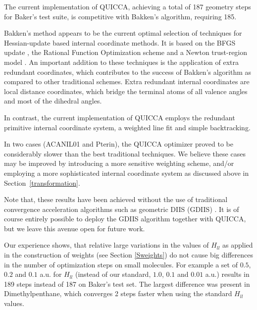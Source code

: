 \documentclass[prl,twocolumn,showpacs,twocolumngrid,superbib]{revtex4}
\begin{document}
The current implementation of QUICCA, achieving a total of 187 geometry steps for Baker's test suite, is 
competitive with Bakken's algorithm, requiring 185.  

Bakken's method \cite{bakken} appears to be the current 
optimal selection of techniques
for Hessian-update based internal coordinate methods. It is based
on the BFGS update \cite{RFletcher}, the Rational Function Optimization
scheme \cite{benerji_RFO} and a Newton trust-region model \cite{RFletcher}. An important addition
to these techniques is the application of
extra redundant coordinates, which contributes to the success of Bakken's
algorithm as compared to other traditional schemes. Extra redundant internal 
coordinates are local distance coordinates, which bridge the terminal atoms
of all valence angles and most of the dihedral angles.

In contrast, the
current implementation of QUICCA employs the redundant primitive internal coordinate system, a weighted line
fit and simple backtracking.  

In two cases (ACANIL01 and Pterin), the QUICCA optimizer proved to be 
considerably slower 
than the best traditional techniques.   We believe these cases may be improved by introducing a
more sensitive weighting scheme, and/or employing a more sophisticated internal coordinate
system as discussed above in Section~\ref{transformation}.

Note that, these results have been achieved without the use of traditional convergence acceleration 
algorithms such as geometric DIIS (GDIIS) \cite{Pulay_GDIIS,Farkas_GDIIS}.  It is of course entirely 
possible to deploy the GDIIS algorithm together with QUICCA, but we leave this avenue open for future 
work.

Our experience shows, that relative large variations in the values of $H_{ll}$
as applied in the construction of weights (see Section \ref{Sweights})
do not cause big differences in the number of optimization steps on small
molecules. For example a set of $0.5$, $0.2$ and $0.1$ a.u. for $H_{ll}$ 
(instead of our standard, $1.0$, $0.1$ and $0.01$ a.u.)
results in 189 steps instead of 187 on Baker's test set.
The largest difference was present in Dimethylpenthane, which converges
2 steps faster when using the standard $H_{ll}$ values. 
\end{document}
